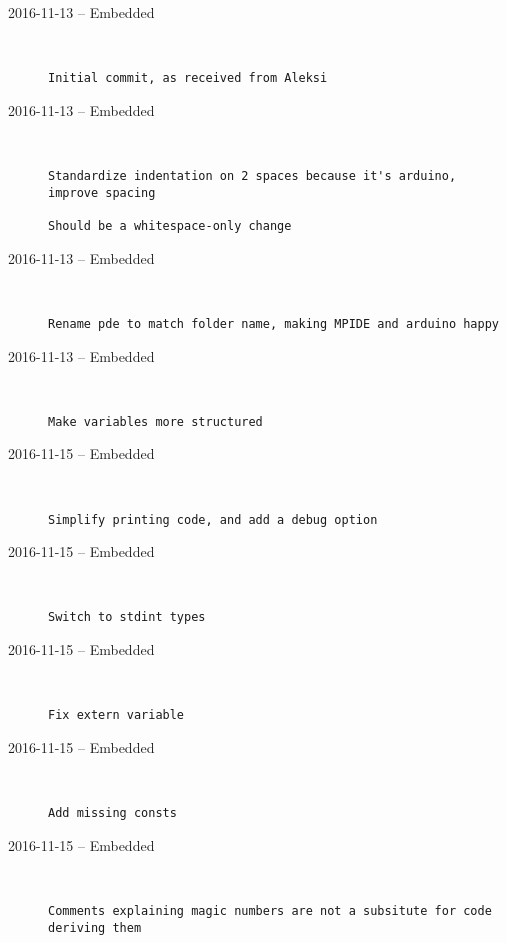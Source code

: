 \begin{description}
  \item[2016-11-13 -- Embedded] \hfill \
\begin{lstlisting}
Initial commit, as received from Aleksi
\end{lstlisting}


  \item[2016-11-13 -- Embedded] \hfill \
\begin{lstlisting}
Standardize indentation on 2 spaces because it's arduino, improve spacing

Should be a whitespace-only change
\end{lstlisting}


  \item[2016-11-13 -- Embedded] \hfill \
\begin{lstlisting}
Rename pde to match folder name, making MPIDE and arduino happy
\end{lstlisting}


  \item[2016-11-13 -- Embedded] \hfill \
\begin{lstlisting}
Make variables more structured
\end{lstlisting}


  \item[2016-11-15 -- Embedded] \hfill \
\begin{lstlisting}
Simplify printing code, and add a debug option
\end{lstlisting}


  \item[2016-11-15 -- Embedded] \hfill \
\begin{lstlisting}
Switch to stdint types
\end{lstlisting}


  \item[2016-11-15 -- Embedded] \hfill \
\begin{lstlisting}
Fix extern variable
\end{lstlisting}


  \item[2016-11-15 -- Embedded] \hfill \
\begin{lstlisting}
Add missing consts
\end{lstlisting}


  \item[2016-11-15 -- Embedded] \hfill \
\begin{lstlisting}
Comments explaining magic numbers are not a subsitute for code deriving them


\end{lstlisting}
\end{description}
